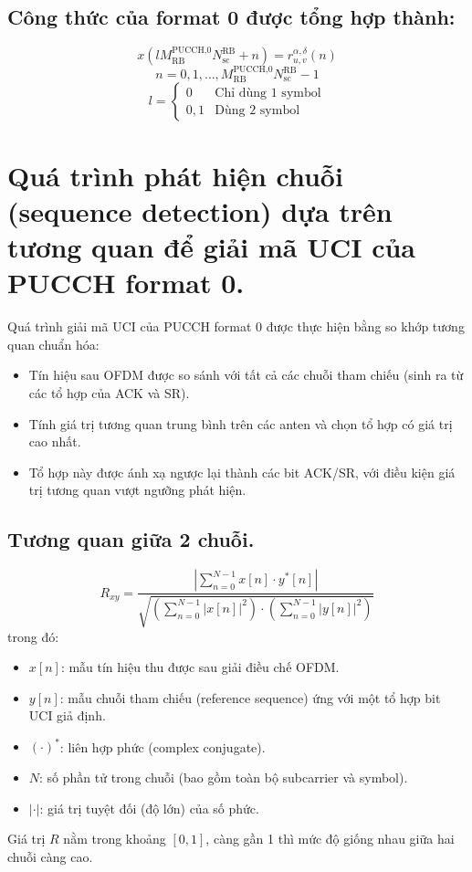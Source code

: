 \subsection{Công thức của format 0 được tổng hợp thành:}
\begin{equation}
x\left(l M^{\text{PUCCH,0}}_{\text{RB}} N^{\text{RB}}_{\text{sc}} + n\right) = r^{\alpha,\delta}_{u,v}(n)
\end{equation}
\[
n = 0, 1, \ldots, M^{\text{PUCCH,0}}_{\text{RB}} N^{\text{RB}}_{\text{sc}} - 1
\]
\[
l = 
\begin{cases}
0 & \text{Chỉ dùng 1 symbol} \\
0, 1 & \text{Dùng 2 symbol}
\end{cases}
\]



\section{Quá trình phát hiện chuỗi (sequence detection) dựa trên tương quan để giải mã UCI của PUCCH format 0.}
Quá trình giải mã UCI của PUCCH format 0 được thực hiện bằng so khớp tương quan chuẩn hóa: 
\begin{itemize}
    \item Tín hiệu sau OFDM được so sánh với tất cả các chuỗi tham chiếu (sinh ra từ các tổ hợp của ACK và SR).
    \item Tính giá trị tương quan trung bình trên các anten và chọn tổ hợp có giá trị cao nhất.
    \item Tổ hợp này được ánh xạ ngược lại thành các bit ACK/SR, với điều kiện giá trị tương quan vượt ngưỡng phát hiện.
\end{itemize}

\subsection{Tương quan giữa 2 chuỗi.}
\begin{equation}
R_{xy} = \frac{\left| \sum_{n=0}^{N-1} x[n] \cdot y^{*}[n] \right|}
{\sqrt{\left( \sum_{n=0}^{N-1} |x[n]|^2 \right) \cdot \left( \sum_{n=0}^{N-1} |y[n]|^2 \right)}}
\end{equation}
%
trong đó:
\begin{itemize}
    \item $x[n]$: mẫu tín hiệu thu được sau giải điều chế OFDM.
    \item $y[n]$: mẫu chuỗi tham chiếu (reference sequence) ứng với một tổ hợp bit UCI giả định.
    \item $(\cdot)^{*}$: liên hợp phức (complex conjugate).
    \item $N$: số phần tử trong chuỗi (bao gồm toàn bộ subcarrier và symbol).
    \item $|\cdot|$: giá trị tuyệt đối (độ lớn) của số phức.
\end{itemize}
%
Giá trị $R$ nằm trong khoảng $[0,1]$, càng gần 1 thì mức độ giống nhau giữa hai chuỗi càng cao.

